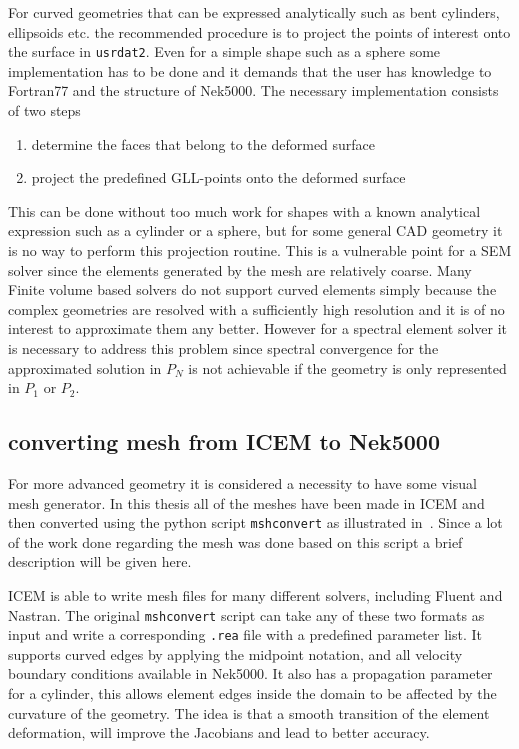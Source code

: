 For curved geometries that can be expressed analytically such as bent cylinders, ellipsoids etc. 
the recommended procedure is to project the points of interest onto the surface
in \verb|usrdat2|. Even for a simple shape such as a sphere some implementation
has to be done and it demands that the user has knowledge to Fortran77 and the structure of Nek5000.
The necessary implementation consists of two steps 
%
\begin{enumerate}
    \item determine the faces that belong to the deformed surface
    \item project the predefined GLL-points onto the deformed surface
\end{enumerate}
%
This can be done without too much work for shapes with a known analytical 
expression such as a cylinder or a sphere, but for some general CAD geometry 
it is no way to perform this projection routine. This is a vulnerable point 
for a SEM solver since the elements generated by the mesh are relatively coarse.
Many Finite volume based solvers do not support curved elements simply because the 
complex geometries are resolved with a sufficiently high resolution and it 
is of no interest to approximate them any better. However for a spectral element
solver it is necessary to address this problem since spectral convergence 
for the approximated solution in $P_N$ is not achievable 
if the geometry is only represented in $P_{1}$ or $P_{2}$.

\subsection{converting mesh from ICEM to Nek5000}

For more advanced geometry it is considered a necessity to have some visual mesh generator.
In this thesis all of the meshes have been made in ICEM and then converted using the python 
script \verb|mshconvert| as illustrated in~. Since a lot 
of the work done regarding the mesh was done based on this script a brief description will be 
given here.

ICEM is able to write mesh files for many different solvers, including Fluent and Nastran. 
The original \verb|mshconvert| script can take any of these two formats as input and write a 
corresponding \verb|.rea| file with a predefined parameter list. It supports curved 
edges by applying the midpoint notation, and all velocity boundary conditions available in Nek5000.
It also has a propagation parameter for a cylinder, this allows element edges inside
the domain to be affected by the curvature of the geometry. The idea is that a smooth 
transition of the element deformation, will improve the Jacobians and lead to better accuracy.  

